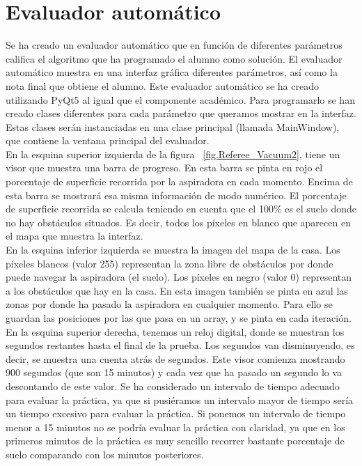 \section{Evaluador automático}
Se ha creado un evaluador automático que en función de diferentes parámetros califica el algoritmo que ha programado el alumno como solución. El evaluador automático muestra en una interfaz gráfica diferentes parámetros, así como la nota final que obtiene el alumno. Este evaluador automático se ha creado utilizando PyQt5 al igual que el componente académico. Para programarlo se han creado clases diferentes para cada parámetro que queramos mostrar en la interfaz. Estas clases serán instanciadas en una clase principal (llamada MainWindow), que contiene la ventana principal del evaluador.\\

En la esquina superior izquierda de la figura ~\ref{fig.Referee_Vacuum2}, tiene un visor que muestra una barra de progreso. En esta barra se pinta en rojo el porcentaje de superficie recorrida por la aspiradora en cada momento. Encima de esta barra se mostrará esa misma información de modo numérico. El porcentaje de superficie recorrida se calcula teniendo en cuenta que el 100\% es el suelo donde no hay obstáculos situados. Es decir, todos los píxeles en blanco que aparecen en el mapa que muestra la interfaz.\\

En la esquina inferior izquierda se muestra la imagen del mapa de la casa. Los píxeles blancos (valor 255) representan la zona libre de obstáculos por donde puede navegar la aspiradora (el suelo). Los píxeles en negro (valor 0) representan a los obstáculos que hay en la casa. En esta imagen también se pinta en azul las zonas por donde ha pasado la aspiradora en cualquier momento. Para ello se guardan las posiciones por las que pasa en un array, y se pinta en cada iteración.\\

En la esquina superior derecha, tenemos un reloj digital, donde se muestran los segundos restantes hasta el final de la prueba. Los segundos van disminuyendo, es decir, se muestra una cuenta atrás de segundos. Este visor comienza mostrando 900 segundos (que son 15 minutos) y cada vez que ha pasado un segundo lo va descontando de este valor. Se ha considerado un intervalo de tiempo adecuado para evaluar la práctica, ya que si pusiéramos un intervalo mayor de tiempo sería un tiempo excesivo para evaluar la práctica. Si ponemos un intervalo de tiempo menor a 15 minutos no se podría evaluar la práctica con claridad, ya que en los primeros minutos de la práctica es muy sencillo recorrer bastante porcentaje de suelo comparando con los minutos posteriores.\\

